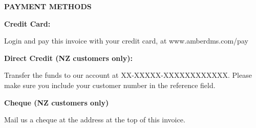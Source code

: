\documentclass[english]{article}
\begin{document}
\noindent \vspace{20mm}


\noindent \begin{flushleft}
\textbf{PAYMENT METHODS}
\vspace{5mm}

\textbf{Credit Card:}

Login and pay this invoice with your credit card, at www.amberdms.com/pay

\vspace{5mm}
\textbf{Direct Credit (NZ customers only):}

Transfer the funds to our account at XX-XXXXX-XXXXXXXXXXXX. Please make sure you include your customer number in the reference field.

\vspace{5mm}
\textbf{Cheque (NZ customers only)}

Mail us a cheque at the address at the top of this invoice.

\end{flushleft}
\end{document}
